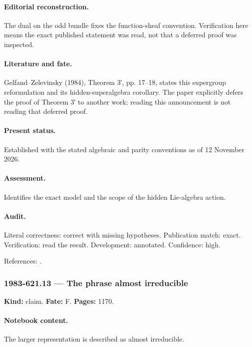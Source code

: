 \paragraph{Editorial reconstruction.} The dual on the odd bundle fixes the function-sheaf convention. Verification here means the exact published statement was read, not that a deferred proof was inspected.

\paragraph{Literature and fate.} Gelfand–Zelevinsky (1984), Theorem 3′, pp. 17–18, states this supergroup reformulation and its hidden-superalgebra corollary. The paper explicitly defers the proof of Theorem 3′ to another work; reading this announcement is not reading that deferred proof.

\paragraph{Present status.} Established with the stated algebraic and parity conventions as of 12 November 2026.

\paragraph{Assessment.} Identifies the exact model and the scope of the hidden Lie-algebra action.

\paragraph{Audit.} Literal correctness: correct with missing hypotheses. Publication match: exact. Verification: read the result. Development: annotated. Confidence: high.

\noindent References: \citep{gelfandzelevinsky1984models}.\par

\subsubsection{1983-621.13 --- The phrase almost irreducible}

\label{item:1983-621.13}

\noindent\textbf{Kind:} claim. \textbf{Fate:} F. \textbf{Pages:} 1170.\par

\paragraph{Notebook content.} The larger representation is described as almost irreducible.

